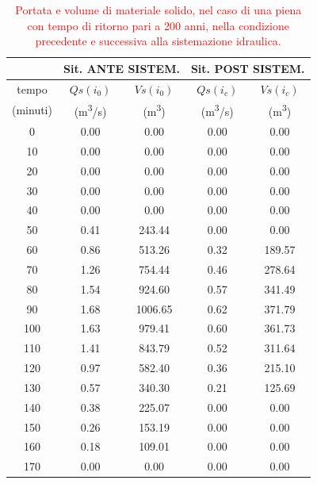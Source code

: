 \begin{table}[H] \centering
    \caption{\textcolor{red}{Portata e volume di materiale solido, nel caso di una piena con tempo di ritorno pari a 200 anni, nella condizione precedente e successiva alla sistemazione idraulica.}}
    \begin{tabular}{ccccc}
        \toprule
& \multicolumn{2}{c}{Sit. ANTE SISTEM.} & \multicolumn{2}{c}{Sit. POST SISTEM.} \\
\midrule
tempo  & $Qs(i_0)$ & $Vs(i_0)$ & $Qs(i_c)$  & $Vs(i_c)$  \\
(minuti) & (\unit{m^3/s}) & (\unit{m^3}) & (\unit{m^3/s})&(\unit{m^3})  \\
\midrule
    0     & 0.00 & 0.00 & 0.00 & 0.00   \\
    10    & 0.00 & 0.00  & 0.00  & 0.00                   \\
    20    & 0.00 & 0.00  & 0.00  & 0.00                   \\
    30    & 0.00 & 0.00 & 0.00  & 0.00                   \\
    40    & 0.00 & 0.00& 0.00   & 0.00                   \\
    50    & 0.41 & 243.44  & 0.00       & 0.00                   \\
    60    & 0.86 & 513.26 & 0.32     & 189.57                 \\
    70    & 1.26                   & 754.44                  & 0.46                    & 278.64                 \\
    80    & 1.54                   & 924.60                  & 0.57                    & 341.49                 \\
    90    & 1.68                   & 1006.65                 & 0.62                    & 371.79                 \\
    100   & 1.63                   & 979.41                  & 0.60                    & 361.73                 \\
    110   & 1.41                   & 843.79                  & 0.52                    & 311.64                 \\
    120   & 0.97                   & 582.40                  & 0.36                    & 215.10                 \\
    130   & 0.57                   & 340.30                  & 0.21                    & 125.69                 \\
    140   & 0.38                   & 225.07                  & 0.00                    & 0.00                   \\
    150   & 0.26                   & 153.19                  & 0.00                    & 0.00                   \\
    160   & 0.18                   & 109.01                  & 0.00                    & 0.00                   \\
    170   & 0.00                   & 0.00                    & 0.00                    & 0.00     \\
    \bottomrule             
    \end{tabular}
    \end{table}

